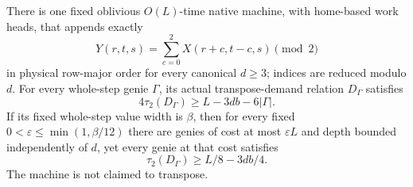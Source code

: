 \begin{proposition}\label{prop:cc-native-obstruction}
\notformalized
There is one fixed oblivious $O(L)$-time native machine, with home-based
work heads, that appends exactly
\[
 Y(r,t,s)=\sum_{c=0}^2 X(r+c,t-c,s)\pmod2
\]
in physical row-major order for every canonical $d\ge3$; indices are
reduced modulo $d$. For every whole-step genie $\Gamma$, its actual
transpose-demand relation $D_\Gamma$ satisfies
\[
 4\tau_2(D_\Gamma)\ge L-3db-6|\Gamma|.
\]
If its fixed whole-step value width is $\beta$, then for every fixed
$0<\varepsilon\le\min(1,\beta/12)$ there are genies of cost at most
$\varepsilon L$ and depth bounded independently of $d$, yet every genie
at that cost satisfies
\[
 \tau_2(D_\Gamma)\ge L/8-3db/4.
\]
The machine is not claimed to transpose.
\end{proposition}
